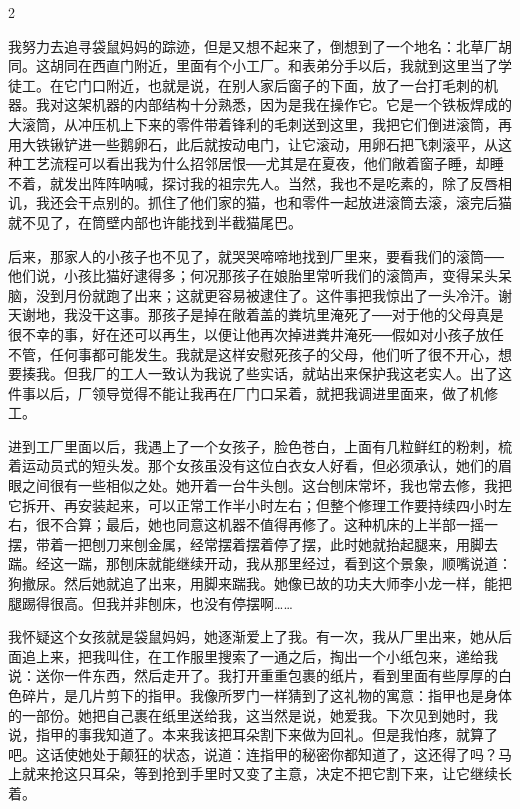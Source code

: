 2 

我努力去追寻袋鼠妈妈的踪迹，但是又想不起来了，倒想到了一个地名：北草厂胡同。这胡同在西直门附近，里面有个小工厂。和表弟分手以后，我就到这里当了学徒工。在它门口附近，也就是说，在别人家后窗子的下面，放了一台打毛刺的机器。我对这架机器的内部结构十分熟悉，因为是我在操作它。它是一个铁板焊成的大滚筒，从冲压机上下来的零件带着锋利的毛刺送到这里，我把它们倒进滚筒，再用大铁锹铲进一些鹅卵石，此后就按动电门，让它滚动，用卵石把飞刺滚平，从这种工艺流程可以看出我为什么招邻居恨──尤其是在夏夜，他们敞着窗子睡，却睡不着，就发出阵阵呐喊，探讨我的祖宗先人。当然，我也不是吃素的，除了反唇相讥，我还会干点别的。抓住了他们家的猫，也和零件一起放进滚筒去滚，滚完后猫就不见了，在筒壁内部也许能找到半截猫尾巴。 

后来，那家人的小孩子也不见了，就哭哭啼啼地找到厂里来，要看我们的滚筒──他们说，小孩比猫好逮得多；何况那孩子在娘胎里常听我们的滚筒声，变得呆头呆脑，没到月份就跑了出来；这就更容易被逮住了。这件事把我惊出了一头冷汗。谢天谢地，我没干这事。那孩子是掉在敞着盖的粪坑里淹死了──对于他的父母真是很不幸的事，好在还可以再生，以便让他再次掉进粪井淹死──假如对小孩子放任不管，任何事都可能发生。我就是这样安慰死孩子的父母，他们听了很不开心，想要揍我。但我厂的工人一致认为我说了些实话，就站出来保护我这老实人。出了这件事以后，厂领导觉得不能让我再在厂门口呆着，就把我调进里面来，做了机修工。 

进到工厂里面以后，我遇上了一个女孩子，脸色苍白，上面有几粒鲜红的粉刺，梳着运动员式的短头发。那个女孩虽没有这位白衣女人好看，但必须承认，她们的眉眼之间很有一些相似之处。她开着一台牛头刨。这台刨床常坏，我也常去修，我把它拆开、再安装起来，可以正常工作半小时左右；但整个修理工作要持续四小时左右，很不合算；最后，她也同意这机器不值得再修了。这种机床的上半部一摇一摆，带着一把刨刀来刨金属，经常摆着摆着停了摆，此时她就抬起腿来，用脚去踹。经这一踹，那刨床就能继续开动，我从那里经过，看到这个景象，顺嘴说道：狗撤尿。然后她就追了出来，用脚来踹我。她像已故的功夫大师李小龙一样，能把腿踢得很高。但我并非刨床，也没有停摆啊…… 

我怀疑这个女孩就是袋鼠妈妈，她逐渐爱上了我。有一次，我从厂里出来，她从后面追上来，把我叫住，在工作服里搜索了一通之后，掏出一个小纸包来，递给我说：送你一件东西，然后走开了。我打开重重包裹的纸片，看到里面有些厚厚的白色碎片，是几片剪下的指甲。我像所罗门一样猜到了这礼物的寓意：指甲也是身体的一部份。她把自己裹在纸里送给我，这当然是说，她爱我。下次见到她时，我说，指甲的事我知道了。本来我该把耳朵割下来做为回礼。但是我怕疼，就算了吧。这话使她处于颠狂的状态，说道：连指甲的秘密你都知道了，这还得了吗？马上就来抢这只耳朵，等到抢到手里时又变了主意，决定不把它割下来，让它继续长着。 

